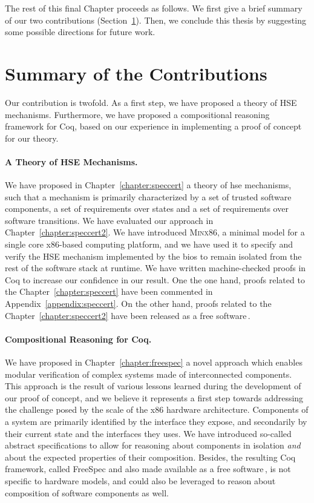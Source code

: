 The rest of this final Chapter proceeds as follows.
%
We first give a brief summary of our two contributions
(Section~\ref{sec:conclusion:summary}).
%
Then, we conclude this thesis by suggesting some possible directions for future
work.

\section{Summary of the Contributions}
\label{sec:conclusion:summary}

Our contribution is twofold.
%
As a first step, we have proposed a theory of HSE mechanisms.
%
Furthermore, we have proposed a compositional reasoning framework for Coq, based
on our experience in implementing a proof of concept for our theory.

\paragraph{A Theory of HSE Mechanisms.}
%
We have proposed in Chapter~\ref{chapter:speccert} a theory of \ac{hse}
mechanisms, such that a mechanism is primarily characterized by a set of trusted
software components, a set of requirements over states and a set of requirements
over software transitions.
%
We have evaluated our approach in Chapter~\ref{chapter:speccert2}.
%
We have introduced {\scshape Minx86}, a minimal model for a single core
x86-based computing platform, and we have used it to specify and verify the HSE
mechanism implemented by the \ac{bios} to remain isolated from the rest of the
software stack at runtime.
%
We have written machine-checked proofs in Coq to increase our confidence in our
result.
%
One the one hand, proofs related to the Chapter~\ref{chapter:speccert} have been
commented in Appendix~\ref{appendix:speccert}.
%
On the other hand, proofs related to the Chapter~\ref{chapter:speccert2} have
been released as a free software\,\cite{letan2016speccertcode}.

\paragraph{Compositional Reasoning for Coq.}
%
We have proposed in Chapter~\ref{chapter:freespec} a novel approach which
enables modular verification of complex systems made of interconnected
components.
%
This approach is the result of various lessons learned during the development of
our proof of concept, and we believe it represents a first step towards
addressing the challenge posed by the scale of the x86 hardware architecture.
%
Components of a system are primarily identified by the interface they expose,
and secondarily by their current state and the interfaces they uses.
%
We have introduced so-called abstract specifications to allow for reasoning
about components in isolation \emph{and} about the expected properties of their
composition.
%
Besides, the resulting Coq framework, called FreeSpec and also made available as
a free software\,\cite{letan2018freespeccode}, is not specific to hardware
models, and could also be leveraged to reason about composition of software
components as well.


